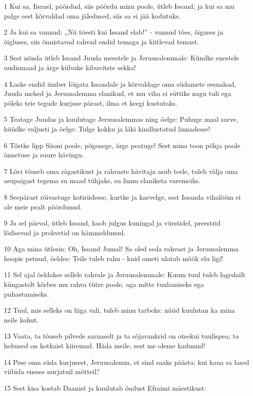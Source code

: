\par 1 Kui sa, Iisrael, pöördud, siis pöördu minu poole, ütleb Issand; ja kui sa mu palge eest kõrvaldad oma jäledused, siis sa ei jää kodutuks.
\par 2 Ja kui sa vannud: „Nii tõesti kui Issand elab!” - vannud tões, õiguses ja õigluses, siis õnnistavad rahvad endid temaga ja kiitlevad temast.
\par 3 Sest nõnda ütleb Issand Juuda meestele ja Jeruusalemmale: Kündke enestele uudismaad ja ärge külvake kibuvitste sekka!
\par 4 Laske endid ümber lõigata Issandale ja kõrvaldage oma südamete eesnahad, Juuda mehed ja Jeruusalemma elanikud, et mu viha ei süttiks nagu tuli ega põleks teie tegude kurjuse pärast, ilma et keegi kustutaks.
\par 5 Teatage Juudas ja kuulutage Jeruusalemmas ning öelge: Puhuge maal sarve, hüüdke valjusti ja öelge: Tulge kokku ja läki kindlustatud linnadesse!
\par 6 Tõstke lipp Siioni poole, põgenege, ärge peatuge! Sest mina toon põhja poole õnnetuse ja suure hävingu.
\par 7 Lõvi tõuseb oma rägastikust ja rahvaste hävitaja asub teele, tuleb välja oma asupaigast tegema su maad tühjaks, su linnu elaniketa varemeiks.
\par 8 Seepärast rõivastuge kotiriidesse, kurtke ja kaevelge, sest Issanda vihalõõm ei ole meie pealt pöördunud.
\par 9 Ja sel päeval, ütleb Issand, kaob julgus kuningal ja vürstidel, preestrid lõdisevad ja prohvetid on hämmeldunud.
\par 10 Aga mina ütlesin: Oh, Issand Jumal! Sa oled seda rahvast ja Jeruusalemma hoopis petnud, öeldes: Teile tuleb rahu - kuid ometi ulatab mõõk elu ligi!
\par 11 Sel ajal öeldakse sellele rahvale ja Jeruusalemmale: Kuum tuul tuleb lagedailt küngastelt kõrbes mu rahva tütre poole, aga mitte tuulamiseks ega puhastamiseks.
\par 12 Tuul, mis selleks on liiga vali, tuleb minu tarbeks: nüüd kuulutan ka mina neile kohut.
\par 13 Vaata, ta tõuseb pilvede sarnaselt ja ta sõjavankrid on otsekui tuulispea; ta hobused on kotkaist kiiremad. Häda meile, sest me oleme kadunud!
\par 14 Pese oma süda kurjusest, Jeruusalemm, et sind saaks päästa; kui kaua sa lased viibida eneses nurjatuil mõtteil?
\par 15 Sest kisa kostab Daanist ja kuulutab õudust Efraimi mäestikust:
